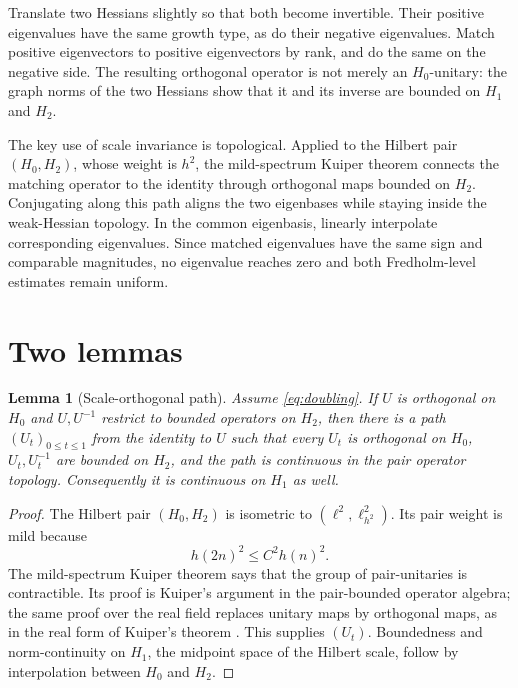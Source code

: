 \documentclass[11pt]{article}
\newtheorem{lemma}[theorem]{Lemma}
\begin{document}
Translate two Hessians slightly so that both become invertible.  Their
positive eigenvalues have the same growth type, as do their negative
eigenvalues.  Match positive eigenvectors to positive eigenvectors by rank,
and do the same on the negative side.  The resulting orthogonal operator is
not merely an $H_0$-unitary: the graph norms of the two Hessians show that it
and its inverse are bounded on $H_1$ and $H_2$.

The key use of scale invariance is topological.  Applied to the Hilbert pair
$(H_0,H_2)$, whose weight is $h^2$, the mild-spectrum Kuiper theorem connects
the matching operator to the identity through orthogonal maps bounded on
$H_2$.  Conjugating along this path aligns the two eigenbases while staying
inside the weak-Hessian topology.  In the common eigenbasis, linearly
interpolate corresponding eigenvalues.  Since matched eigenvalues have the
same sign and comparable magnitudes, no eigenvalue reaches zero and both
Fredholm-level estimates remain uniform.

\section{Two lemmas}

\begin{lemma}[Scale-orthogonal path]\label{lem:kuiper}
Assume \eqref{eq:doubling}.  If $U$ is orthogonal on $H_0$ and $U,U^{-1}$
restrict to bounded operators on $H_2$, then there is a path $(U_t)_{0\le t\le
1}$ from the identity to $U$ such that every $U_t$ is orthogonal on $H_0$,
$U_t,U_t^{-1}$ are bounded on $H_2$, and the path is continuous in the pair
operator topology.  Consequently it is continuous on $H_1$ as well.
\end{lemma}

\begin{proof}
The Hilbert pair $(H_0,H_2)$ is isometric to
$(\ell^2,\ell^2_{h^2})$.  Its pair weight is mild because
\[
 h(2n)^2\le C^2h(n)^2.
\]
The mild-spectrum Kuiper theorem
\cite[Proposition 33.1.5]{KM} says that the group of pair-unitaries is
contractible.  Its proof is Kuiper's argument in the pair-bounded operator
algebra; the same proof over the real field replaces unitary maps by
orthogonal maps, as in the real form of Kuiper's theorem \cite{Kuiper}.
This supplies $(U_t)$.  Boundedness and norm-continuity on $H_1$, the midpoint
space of the Hilbert scale, follow by interpolation between $H_0$ and $H_2$.
\end{proof}
\end{document}
